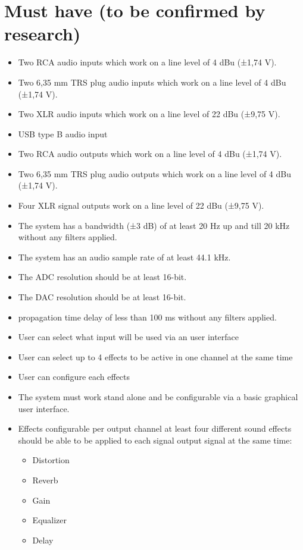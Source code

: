 	\section{Must have (to be confirmed by research)}
	
\begin{itemize}
	\setlength\itemsep{-0.3em}
	\item Two RCA audio inputs which work on a line level of 4 dBu (±1,74 V).
	\item Two 6,35 mm TRS plug audio inputs which work on a line level of 4 dBu (±1,74 V).
	\item Two XLR audio inputs which work on a line level of 22 dBu (±9,75 V).
	\item USB type B audio input
	\item Two RCA audio outputs which work on a line level of 4 dBu (±1,74 V).
	\item Two 6,35 mm TRS plug audio outputs which work on a line level of 4 dBu (±1,74 V).
	\item Four XLR signal outputs work on a line level of 22 dBu (±9,75 V).
	\item The system has a bandwidth (±3 dB) of at least 20 Hz up and till 20 kHz without any filters applied.
	\item The system has an audio sample rate of at least 44.1 kHz.
	\item The ADC resolution should be at least 16-bit.
	\item The DAC resolution should be at least 16-bit.
	\item propagation time delay of less than 100 ms without any filters applied.
	\item User can select what input will be used via an user interface
	\item User can select up to 4 effects to be active in one channel at the same time
	\item User can configure each effects
	\item The system must work stand alone and be configurable via a basic graphical user interface.
	\item Effects configurable per output channel at least four different sound effects should be able to be applied to each signal output signal at the same time:
	\begin{itemize} %
		\setlength\itemsep{-0.3em}
		\item Distortion
		\item Reverb
		\item Gain
		\item Equalizer 
		\item Delay
	\end{itemize}
\end{itemize}
	
